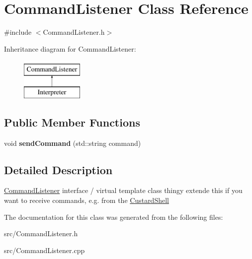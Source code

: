 \hypertarget{class_command_listener}{
\section{\-Command\-Listener \-Class \-Reference}
\label{class_command_listener}
}


{\ttfamily \#include $<$\-Command\-Listener.\-h$>$}

\-Inheritance diagram for \-Command\-Listener\-:\begin{figure}[H]
\begin{center}
\leavevmode
\includegraphics[height=2.000000cm]{class_command_listener}
\end{center}
\end{figure}
\subsection*{\-Public \-Member \-Functions}
\begin{DoxyCompactItemize}
\item 
\hypertarget{class_command_listener_a7620ef52d82b9a118ce7206941815d45}{
void {\bfseries send\-Command} (std\-::string command)}
\label{class_command_listener_a7620ef52d82b9a118ce7206941815d45}

\end{DoxyCompactItemize}


\subsection{\-Detailed \-Description}
\hyperlink{class_command_listener}{\-Command\-Listener} interface / virtual template class thingy extende this if you want to receive commands, e.\-g. from the \hyperlink{class_custard_shell}{\-Custard\-Shell} 

\-The documentation for this class was generated from the following files\-:\begin{DoxyCompactItemize}
\item 
src/\-Command\-Listener.\-h\item 
src/\-Command\-Listener.\-cpp\end{DoxyCompactItemize}
